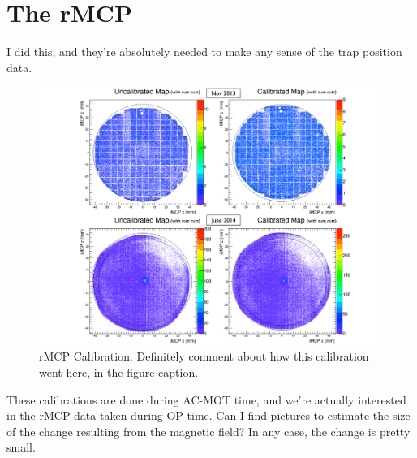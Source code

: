 \section{The rMCP}
	I did this, and they're absolutely needed to make any sense of the trap position data.  
\begin{figure}[h!!t]
	\centering
	\includegraphics[width=.999\linewidth]
	{Figures/rMCP_Calibration}
	\caption[rMCP Calibration]{rMCP Calibration.  Definitely comment about how this calibration went here, in the figure caption. }	
	\label{fig:rmcp_calibration}
\end{figure}
	These calibrations are done during AC-MOT time, and we're actually interested in the rMCP data taken during OP time.  Can I find pictures to estimate the size of the change resulting from the magnetic field?  In any case, the change is pretty small.  

